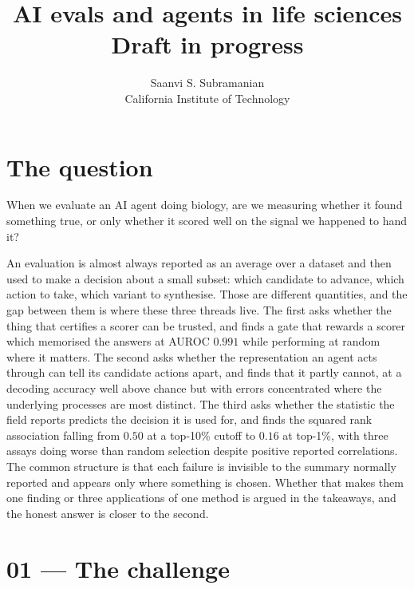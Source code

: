 \documentclass[11pt]{article}
\title{AI evals and agents in life sciences\\\large Draft in progress}
\author{Saanvi S. Subramanian \\ California Institute of Technology}
\date{}
\begin{document}
\maketitle

\begin{center}
\end{center}

\section*{The question}

When we evaluate an AI agent doing biology, are we measuring whether it found something true, or only whether
it scored well on the signal we happened to hand it?

An evaluation is almost always reported as an average over a dataset and then used to make a decision about
a small subset: which candidate to advance, which action to take, which variant to synthesise. Those are
different quantities, and the gap between them is where these three threads live. The first asks whether the
thing that certifies a scorer can be trusted, and finds a gate that rewards a scorer which memorised the
answers at AUROC $0.991$ while performing at random where it matters. The second asks whether the
representation an agent acts through can tell its candidate actions apart, and finds that it partly cannot,
at a decoding accuracy well above chance but with errors concentrated where the underlying processes are most
distinct. The third asks whether the statistic the field reports predicts the decision it is used for, and
finds the squared rank association falling from $0.50$ at a top-10\% cutoff to $0.16$ at top-1\%, with three
assays doing worse than random selection despite positive reported correlations. The common structure is that
each failure is invisible to the summary normally reported and appears only where something is chosen.
Whether that makes them one finding or three applications of one method is argued in the takeaways, and the
honest answer is closer to the second.

\section*{01 --- The challenge}
\end{document}
